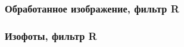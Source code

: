 \documentclass[aspectratio=169, hyperref={bookmarks=false}]{beamer}
\begin{document}
\begin{frame}
\frametitle{Обработанное изображение, фильтр R}

    \begin{minipage}[h]{\linewidth} 
    \end{minipage}
 
\end{frame}

\begin{frame}
\frametitle{Изофоты, фильтр R}

    \begin{minipage}[h]{0.9\linewidth} 
    \end{minipage}

\end{frame}
\end{document}
